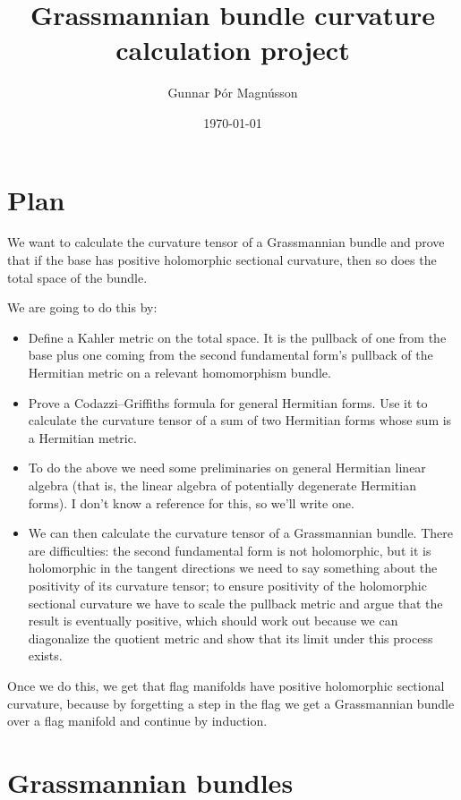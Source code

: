 \documentclass[10pt,a4paper]{article}
\author{Gunnar Þór Magnússon}
\date{\today}
\title{Grassmannian bundle curvature calculation project}
\begin{document}
\maketitle



\section{Plan}

We want to calculate the curvature tensor of a Grassmannian bundle and prove that if the base has positive holomorphic sectional curvature, then so does the total space of the bundle.

We are going to do this by:
\begin{itemize}
  \item Define a Kahler metric on the total space. It is the pullback of one from the base plus one coming from the second fundamental form's pullback of the Hermitian metric on a relevant homomorphism bundle.

  \item Prove a Codazzi--Griffiths formula for general Hermitian forms. Use it to calculate the curvature tensor of a sum of two Hermitian forms whose sum is a Hermitian metric.

  \item To do the above we need some preliminaries on general Hermitian linear algebra (that is, the linear algebra of potentially degenerate Hermitian forms). I don't know a reference for this, so we'll write one.

  \item We can then calculate the curvature tensor of a Grassmannian bundle. There are difficulties: the second fundamental form is not holomorphic, but it is holomorphic in the tangent directions we need to say something about the positivity of its curvature tensor; to ensure positivity of the holomorphic sectional curvature we have to scale the pullback metric and argue that the result is eventually positive, which should work out because we can diagonalize the quotient metric and show that its limit under this process exists.
\end{itemize}

Once we do this, we get that flag manifolds have positive holomorphic sectional curvature, because by forgetting a step in the flag we get a Grassmannian bundle over a flag manifold and continue by induction.



\section{Grassmannian bundles}
\end{document}
